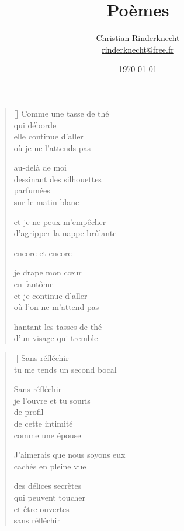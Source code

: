 \documentclass[12pt,a4paper]{article}
\title{Poèmes}
\author{Christian Rinderknecht\\
{\small \url{rinderknecht@free.fr}}}
\date{\today}
\begin{document}
\maketitle

\thispagestyle{empty}

\newpage\leavevmode\thispagestyle{empty}\newpage


\newpage

\poemtitle{}

\settowidth{\versewidth}{d'agripper le nappe brûlante}

\bigskip

\begin{verse}[\versewidth]
  Comme une tasse de thé \\
  qui déborde \\

  elle continue d'aller \\
  où je ne l'attends pas

  au-delà de moi \\
  dessinant des silhouettes \\
  parfumées \\
  sur le matin blanc

  et je ne peux m'empêcher \\
  d'agripper la nappe brûlante

  encore et encore

  je drape mon cœur \\
  en fantôme \\
  et je continue d'aller \\
  où l'on ne m'attend pas

  hantant les tasses de thé \\
  d'un visage qui tremble
\end{verse}


\newpage

\poemtitle{}

\settowidth{\versewidth}{J'aimerais que nous soyons eux}

\bigskip

\begin{verse}[\versewidth]
  Sans réfléchir \\
  tu me tends un second bocal

  Sans réfléchir \\
  je l'ouvre et tu souris \\
  de profil \\
  de cette intimité \\
  comme une épouse

  J'aimerais que nous soyons eux \\

  cachés en pleine vue

  des délices secrètes \\
  qui peuvent toucher \\
  et être ouvertes \\
  sans réfléchir
\end{verse}
\end{document}
